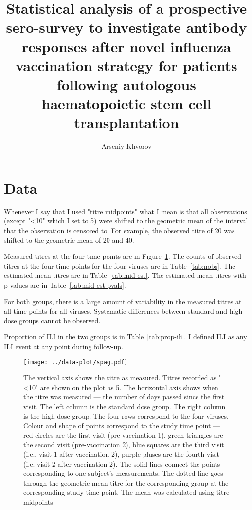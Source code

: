 \documentclass[11pt]{article}
\title{Statistical analysis of a prospective sero-survey to investigate
antibody responses
after novel influenza vaccination strategy
for patients following autologous
haematopoietic stem cell transplantation}
\author{Arseniy Khvorov}
\begin{document}
\maketitle

\section{Data}

Whenever I say that I used "titre midpoints" what I mean is that all
observations (except "<10" which I set to 5) were shifted to the geometric mean
of the interval that the observation is censored to. For example, the observed
titre of 20 was shifted to the geometric mean of 20 and 40.

Measured titres at the four time points are in Figure~\ref{fig:spag}.
The counts of observed titres at the four time points for the four viruses are
in Table~\ref{tab:nobs}.
The estimated mean titres are in Table~\ref{tab:mid-est}.
The estimated mean titres with p-values are in Table~\ref{tab:mid-est-pvals}.

For both groups, there is a large amount of variability in the measured titres
at all time points for all viruses. Systematic differences between standard and
high dose groups cannot be observed.

Proportion of ILI in the two groups is in Table~\ref{tab:prop-ili}.
I defined ILI as any ILI event at any point during follow-up.









\begin{figure}[htp]
    \centering
    \texttt{[image: ../data-plot/spag.pdf]}
    \caption{
        The vertical axis shows the titre as measured.
        Titres recorded as "<10" are shown on the plot as 5.
        The horizontal axis shows when the titre was measured --- the number of
        days passed since the first visit.
        The left column is the standard dose group.
        The right column is the high dose group.
        The four rows correspond to the four viruses.
        Colour and shape of points correspond to the study time point ---
        red circles are the first visit (pre-vaccination 1),
        green triangles are the second visit (pre-vaccination 2),
        blue squares are the third visit (i.e., visit 1 after vaccination 2),
        purple pluses are the fourth visit (i.e. visit 2 after vaccination 2).
        The solid lines connect the points
        corresponding to one subject's measurements.
        The dotted line goes through the geometric mean titre for the
        corresponding group at the corresponding study time point. The mean was
        calculated using titre midpoints.
    }
    \label{fig:spag}
\end{figure}
\end{document}
